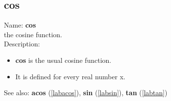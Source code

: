 \subsection{cos}
\label{labcos}
\noindent Name: \textbf{cos}\\
the cosine function.\\

\noindent Description: \begin{itemize}

\item \textbf{cos} is the usual cosine function.

\item It is defined for every real number x.
\end{itemize}
See also: \textbf{acos} (\ref{labacos}), \textbf{sin} (\ref{labsin}), \textbf{tan} (\ref{labtan})
